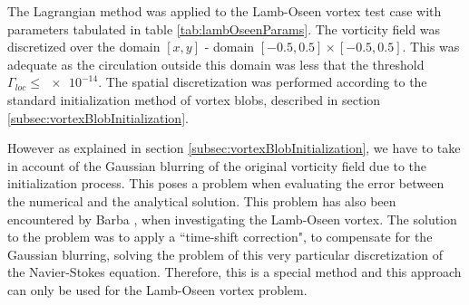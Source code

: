 	

The Lagrangian method was applied to the Lamb-Oseen vortex test case with parameters tabulated in table \ref{tab:lambOseenParams}. The vorticity field was discretized over the domain $[x,y]$ - domain $\left[-0.5,0.5\right]\times\left[-0.5,0.5\right]$. This was adequate as the circulation outside this domain was less that the threshold $\Gamma_{loc}\le\num{e-14}$. The spatial discretization was performed according to the standard initialization method of vortex blobs, described in section \ref{subsec:vortexBlobInitialization}.

However as explained in section \ref{subsec:vortexBlobInitialization}, we have to take in account of the Gaussian blurring of the original vorticity field due to the initialization process. This poses a problem when evaluating the error between the numerical and the analytical solution. This problem has also been encountered by Barba \cite{Barba2004c}, when investigating the Lamb-Oseen vortex. The solution to the problem was to apply a ``time-shift correction", to compensate for the Gaussian blurring, solving the problem of this very particular discretization of the Navier-Stokes equation. Therefore, this is a special method and this approach can only be used for the Lamb-Oseen vortex problem.

